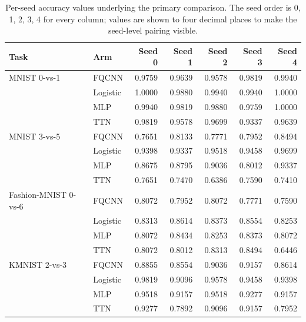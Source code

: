 \documentclass[conference]{IEEEtran}
\begin{document}
\begin{table}[!t]
\caption{Per-seed accuracy values underlying the primary comparison. The seed order is 0, 1, 2, 3, 4 for every column; values are shown to four decimal places to make the seed-level pairing visible.}
\label{tab:seedvalues}
\centering
\small
\begin{tabular}{@{}llrrrrr@{}}
\toprule
\textbf{Task} & \textbf{Arm} & \textbf{Seed 0} & \textbf{Seed 1} & \textbf{Seed 2} & \textbf{Seed 3} & \textbf{Seed 4} \\
\midrule
MNIST 0-vs-1 & FQCNN & 0.9759 & 0.9639 & 0.9578 & 0.9819 & 0.9940 \\
 & Logistic & 1.0000 & 0.9880 & 0.9940 & 0.9940 & 1.0000 \\
 & MLP & 0.9940 & 0.9819 & 0.9880 & 0.9759 & 1.0000 \\
 & TTN & 0.9819 & 0.9578 & 0.9699 & 0.9337 & 0.9639 \\
\addlinespace
MNIST 3-vs-5 & FQCNN & 0.7651 & 0.8133 & 0.7771 & 0.7952 & 0.8494 \\
 & Logistic & 0.9398 & 0.9337 & 0.9518 & 0.9458 & 0.9699 \\
 & MLP & 0.8675 & 0.8795 & 0.9036 & 0.8012 & 0.9337 \\
 & TTN & 0.7651 & 0.7470 & 0.6386 & 0.7590 & 0.7410 \\
\addlinespace
Fashion-MNIST 0-vs-6 & FQCNN & 0.8072 & 0.7952 & 0.8072 & 0.7771 & 0.7590 \\
 & Logistic & 0.8313 & 0.8614 & 0.8373 & 0.8554 & 0.8253 \\
 & MLP & 0.8072 & 0.8434 & 0.8253 & 0.8373 & 0.8072 \\
 & TTN & 0.8072 & 0.8012 & 0.8313 & 0.8494 & 0.6446 \\
\addlinespace
KMNIST 2-vs-3 & FQCNN & 0.8855 & 0.8554 & 0.9036 & 0.9157 & 0.8614 \\
 & Logistic & 0.9819 & 0.9096 & 0.9578 & 0.9458 & 0.9398 \\
 & MLP & 0.9518 & 0.9157 & 0.9518 & 0.9277 & 0.9157 \\
 & TTN & 0.9277 & 0.7892 & 0.9096 & 0.9157 & 0.7952 \\
\bottomrule
\end{tabular}
\end{table}
\end{document}
